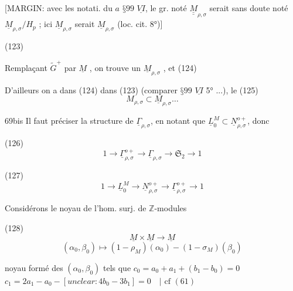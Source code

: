 [MARGIN: avec les notati. du $a$ $§ 99$ $\underline{VI}$, le gr. noté $\underline{\underline{M}}_{\rho,\sigma}$ serait sans doute noté $\underline{M}_{\rho,\sigma}/H_p$ ; ici $\underline{M}_{\rho,\sigma}$ serait $\underline{M}_{\rho,\sigma}$ (loc. cit. 8°)]

(123)

Remplaçant $\tilde{G}^+$ par $\underline{M}$ , on trouve un $\underline{M}_{\rho,\sigma}$ , et
(124)

D'ailleurs on a dans (124)
dans (123) (comparer $§ 99$ $\underline{VI}$ 5° ...), le
(125) $$M_{\rho,\sigma} \subset \underline{M}_{\rho,\sigma} \dots$$

\newpage


69bis
Il faut préciser la structure de $\underline{\Gamma}_{\rho,\sigma}$,
en notant que $\underline{L}_0^M \subset \underline{N}_{\rho,\sigma}^{o+}$, donc

(126) $$1 \to \underline{\Gamma}_{\rho,\sigma}^{o+} \to \underline{\Gamma}_{\rho,\sigma} \to \mathfrak{S}_2 \to 1$$

(127) $$1 \to \underline{L}_0^M \to \underline{N}_{\rho,\sigma}^{o+} \to \underline{\Gamma}_{\rho,\sigma}^{o+} \to 1$$

Considérons le noyau de l'hom. surj. de $\mathbb{Z}$-modules

(128) $$\underline{M} \times \underline{M} \to \underline{M}$$
$$(\alpha_0, \beta_0) \mapsto (1-\rho_M)(\alpha_0) - (1-\sigma_M)(\beta_0)$$

noyau formé des $(\alpha_0, \beta_0)$ tels que
$c_0 = a_0 + a_1 + (b_1 - b_0) = 0$
$c_1 = 2a_1 - a_0 - [unclear: 4b_0 - 3b_1] = 0 \quad | \text{ cf } (61)$

